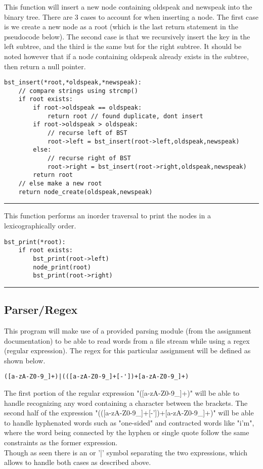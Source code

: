 \documentclass[
	12pt, %
]{fphw}
\begin{document}
This function will insert a new node containing oldspeak and newspeak into the binary tree. There are 3 cases to account for when inserting a node. The first case is we create a new node as a root (which is the last return statement in the pseudocode below). The second case is that we recursively insert the key in the left subtree, and the third is the same but for the right subtree. It should be noted however that if a node containing oldspeak already exists in the subtree, then return a null pointer.
\begin{lstlisting}[mathescape=true]
bst_insert(*root,*oldspeak,*newspeak):
	// compare strings using strcmp()
	if root exists:
		if root->oldspeak == oldspeak:
			return root // found duplicate, dont insert
		if root->oldspeak > oldspeak:
			// recurse left of BST
			root->left = bst_insert(root->left,oldspeak,newspeak)
		else:
			// recurse right of BST
			root->right = bst_insert(root->right,oldspeak,newspeak)
		return root
	// else make a new root
	return node_create(oldspeak,newspeak)
\end{lstlisting}
\noindent\rule{6.3in}{0.4pt}

This function performs an inorder traversal to print the nodes in a lexicographically order.
\begin{lstlisting}[mathescape=true]
bst_print(*root):
	if root exists:
		bst_print(root->left)
		node_print(root)
		bst_print(root->right)
\end{lstlisting}
\noindent\rule{6.3in}{0.4pt}

\subsection{Parser/Regex}

This program will make use of a provided parsing module (from the assignment documentation) to be able to read words from a file stream while using a regex (regular expression). The regex for this particular assignment will be defined as shown below.
\begin{lstlisting}
([a-zA-Z0-9_]+)|(([a-zA-Z0-9_]+[-'])+[a-zA-Z0-9_]+)
\end{lstlisting}
The first portion of the regular expression "([a-zA-Z0-9\_]+)" will be able to handle recognizing any word containing a character between the brackets. The second half of the expression "(([a-zA-Z0-9\_]+[-'])+[a-zA-Z0-9\_]+)" will be able to handle hyphenated words such as "one-sided" and contracted words like "i'm", where the word being connected by the hyphen or single quote follow the same constraints as the former expression. \\
Though as seen there is an or '|' symbol separating the two expressions, which allows to handle both cases as described above.
\end{document}
